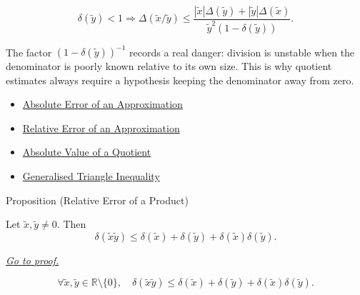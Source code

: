 \begin{remark*}
\[
\delta(\widetilde{y})<1\Rightarrow \Delta(\widetilde{x}/\widetilde{y})\leq \frac{|\widetilde{x}|\Delta(\widetilde{y})+|\widetilde{y}|\Delta(\widetilde{x})}{\widetilde{y}^{2}(1-\delta(\widetilde{y}))}.
\]
\end{remark*}

\begin{remark*}[Interpretation]
The factor $(1-\delta(\widetilde{y}))^{-1}$ records a real danger: division
is unstable when the denominator is poorly known relative to its own size.
This is why quotient estimates always require a hypothesis keeping the
denominator away from zero.
\end{remark*}

\begin{dependencies}
\begin{itemize}
  \item \hyperref[def:absolute-error-approximation]{Absolute Error of an Approximation}
  \item \hyperref[def:relative-error-approximation]{Relative Error of an Approximation}
  \item \hyperref[thm:absolute-value-quotient]{Absolute Value of a Quotient}
  \item \hyperref[thm:absolute-value-sum-bound]{Generalised Triangle Inequality}
\end{itemize}
\end{dependencies}

\begin{propositionbox}{Proposition (Relative Error of a Product)}
\begin{proposition}
\label{prop:relative-error-product}
Let $\widetilde{x},\widetilde{y}\neq 0$. Then
\[
  \delta(\widetilde{x}\widetilde{y})
  \leq
  \delta(\widetilde{x})
  +
  \delta(\widetilde{y})
  +
  \delta(\widetilde{x})\delta(\widetilde{y}).
\]

\smallskip\noindent
\hyperref[prf:relative-error-product]{\textit{Go to proof.}}
\end{proposition}
\end{propositionbox}

\begin{remark*}
\[
\forall \widetilde{x},\widetilde{y}\in\mathbb{R}\setminus\{0\},\quad
\delta(\widetilde{x}\widetilde{y})
\leq \delta(\widetilde{x})+\delta(\widetilde{y})
+\delta(\widetilde{x})\delta(\widetilde{y}).
\]
\end{remark*}

